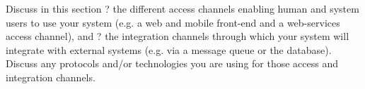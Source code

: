 Discuss in this section
? the different access channels enabling human and system users to use your system (e.g. a web
and mobile front-end and a web-services access channel), and
? the integration channels through which your system will integrate with external systems (e.g.
via a message queue or the database).
Discuss any protocols and/or technologies you are using for those access and integration channels.